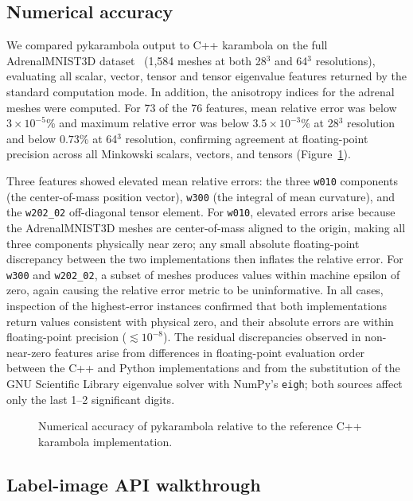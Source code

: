 \documentclass[times, twoside, watermark]{zHenriquesLab-StyleBioRxiv}
\begin{document}
\subsection*{Numerical accuracy}

We compared pykarambola output to C++ karambola on the full AdrenalMNIST3D dataset~\cite{Yang2023MedMNIST} (1{,}584 meshes at both 28$^3$ and 64$^3$ resolutions), evaluating all scalar, vector, tensor and tensor eigenvalue features returned by the standard computation mode.
In addition, the anisotropy indices for the adrenal meshes were computed.
For 73 of the 76 features, mean relative error was below $3 \times 10^{-5}$\% and maximum relative error was below $3.5 \times 10^{-3}$\% at 28$^3$ resolution and below $0.73$\% at 64$^3$ resolution, confirming agreement at floating-point precision across all Minkowski scalars, vectors, and tensors (Figure~\ref{fig:accuracy}).

Three features showed elevated mean relative errors: the three \texttt{w010} components (the center-of-mass position vector), \texttt{w300} (the integral of mean curvature), and the \texttt{w202\_02} off-diagonal tensor element.
For \texttt{w010}, elevated errors arise because the AdrenalMNIST3D meshes are center-of-mass aligned to the origin, making all three components physically near zero; any small absolute floating-point discrepancy between the two implementations then inflates the relative error.
For \texttt{w300} and \texttt{w202\_02}, a subset of meshes produces values within machine epsilon of zero, again causing the relative error metric to be uninformative.
In all cases, inspection of the highest-error instances confirmed that both implementations return values consistent with physical zero, and their absolute errors are within floating-point precision ($\lesssim 10^{-8}$).
The residual discrepancies observed in non-near-zero features arise from differences in floating-point evaluation order between the C++ and Python implementations and from the substitution of the GNU Scientific Library eigenvalue solver with NumPy's \texttt{eigh}; both sources affect only the last 1--2 significant digits.

\begin{figure}
\centering
\caption{Numerical accuracy of pykarambola relative to the reference C++ karambola implementation.}
\label{fig:accuracy}
\end{figure}

\subsection*{Label-image API walkthrough}
\end{document}
